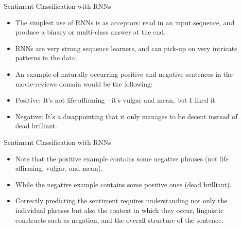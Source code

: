 \documentclass[handout]{beamer}
\begin{document}
\begin{frame}{Sentiment Classification with RNNs}
\begin{scriptsize}
\begin{itemize}
\item The simplest use of RNNs is as acceptors: read in an input sequence, and produce a binary or multi-class answer at the end.
\item RNNs are very strong sequence learners, and can pick-up on very
intricate patterns in the data.
\item An example of naturally occurring positive and negative sentences in the movie-reviews domain would be the following:
\item Positive: It's not life-affirming—it’s vulgar and mean, but I liked it.
\item Negative: It's a disappointing that it only manages to be decent instead of dead brilliant.
\end{itemize}
\end{scriptsize}
\end{frame}



\begin{frame}{Sentiment Classification with RNNs}
\begin{scriptsize}
\begin{itemize}
\item Note that the positive example contains some negative phrases (not life affirming, vulgar, and mean).
\item While the negative example contains some positive ones (dead brilliant).
\item Correctly predicting the sentiment requires understanding not only the individual phrases but also the context in which they occur, linguistic constructs such as negation, and the overall structure of the sentence.
\end{itemize}
\end{scriptsize}
\end{frame}
\end{document}
